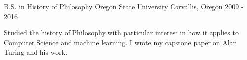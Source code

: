 

\begin{cventries}

  \cventry
    {B.S. in History of Philosophy} %
    {Oregon State University} %
    {Corvallis, Oregon} %
    {2009 - 2016} %
    {
      \begin{cvitems} %
        \item {Studied the history of Philosophy with particular interest in how it applies to Computer Science and machine learning. I wrote my capstone paper on Alan Turing and his work.}
      \end{cvitems}
    }

\end{cventries}
